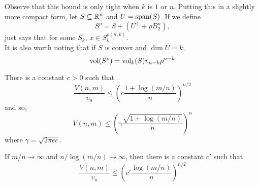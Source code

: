 Observe that this bound is only tight when $k$ is $1$ or $n$. Putting this in a slightly more compact form, let $S\subseteq\mathbb{R}^n$ and $U=\operatorname{span}(S)$. If we define
\[ S^\rho = S + \left(U^\perp + \rho B_2^n\right), \]
 just says that for some $S_k$, $x \in S_k^{\rho(n,k)}$.\\
It is also worth noting that if $S$ is convex and $\dim U = k$,
\begin{equation}
\label{eqn: rho convex body volume}
    \operatorname{vol}(S^\rho) = \operatorname{vol}_k(S) v_{n-k} \rho^{n-k}
\end{equation}

\begin{ftheo}
\label{upper bound on V n m}
There is a constant $c>0$ such that
\[ \frac{V(n,m)}{v_n} \leq \left(c \frac{1+\log(m/n)}{n}\right)^{n/2} \]
and so,
\[ V(n,m) \leq \left(\gamma \frac{\sqrt{1+\log(m/n)}}{n}\right)^{n} \]
where $\gamma=\sqrt{2\pi e c}$.
\end{ftheo}

If $m/n\to\infty$ and $n/\log(m/n)\to\infty$, then there is a constant $c'$ such that
\[ \frac{V(n,m)}{v_n} \leq \left(c' \frac{\log(m/n)}{n}\right)^{n/2} \]

